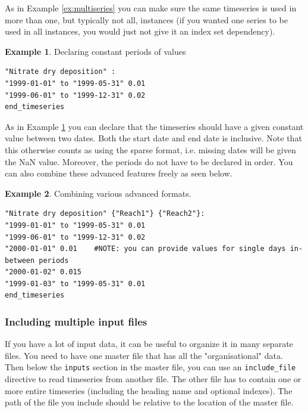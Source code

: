 \documentclass[11pt]{article}
\theoremstyle{definition}
\newtheorem{myexample}{Example}
\newenvironment{example}%
  {\begin{lrbox}{\examplebox}%
   \begin{minipage}{\dimexpr\linewidth-2\fboxsep}
   \begin{myexample}}%
  {\end{myexample}%
   \end{minipage}%
   \end{lrbox}%
   \begin{trivlist}
     \item[]\colorbox{silver}{\usebox\examplebox}
   \end{trivlist}}
\begin{document}
As in Example \ref{ex:multiseries} you can make sure the same timeseries is used in more than one, but typically not all, instances (if you wanted one series to be used in all instances, you would just not give it an index set dependency).

\begin{example}\label{ex:constantperiods}
Declaring constant periods of values
\begin{lstlisting}
"Nitrate dry deposition" :
"1999-01-01" to "1999-05-31" 0.01
"1999-06-01" to "1999-12-31" 0.02
end_timeseries
\end{lstlisting}
\end{example}

As in Example \ref{ex:constantperiods} you can declare that the timeseries should have a given constant value between two dates. Both the start date and end date is inclusive. Note that this otherwise counts as using the sparse format, i.e. missing dates will be given the NaN value. Moreover, the periods do not have to be declared in order. You can also combine these advanced features freely as seen below.

\begin{example}
Combining various advanced formats.
\begin{lstlisting}
"Nitrate dry deposition" {"Reach1"} {"Reach2"}:
"1999-01-01" to "1999-05-31" 0.01
"1999-06-01" to "1999-12-31" 0.02
"2000-01-01" 0.01    #NOTE: you can provide values for single days in-between periods
"2000-01-02" 0.015
"1999-01-03" to "1999-05-31" 0.01
end_timeseries
\end{lstlisting}
\end{example}

\subsubsection{Including multiple input files}

If you have a lot of input data, it can be useful to organize it in many separate files. You need to have one master file that has all the "organisational" data. Then below the {\tt inputs} section in the master file, you can use an {\tt include\_file} directive to read timeseries from another file. The other file has to contain one or more entire timeseries (including the heading name and optional indexes). The path of the file you include should be relative to the location of the master file.
\end{document}
